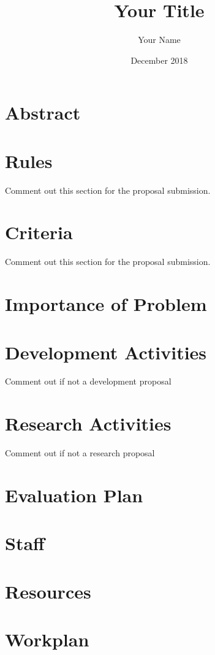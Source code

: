 \documentclass[12pt,letterpaper]{article}
\title{Your Title}
\author{Your Name}
\date{December 2018}
\begin{document}
\maketitle
\thispagestyle{empty}

\tableofcontents
\clearpage
\section*{Abstract}
{

\normalsize

}

\clearpage
{} 

\section{Rules}
Comment out this section for the proposal submission.

\section{Criteria}
Comment out this section for the proposal submission.

\section{Importance of Problem}

\section{Development Activities}
Comment out if not a development proposal

\section{Research Activities}
Comment out if not a research proposal

\section{Evaluation Plan}

\section{Staff}

\section{Resources}

\section{Workplan}

\end{document}
